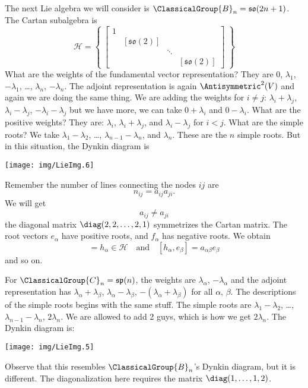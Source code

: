The next Lie algebra we will consider is
$\ClassicalGroup{B}_{n}=\mathfrak{so}(2n+1)$. The Cartan
subalgebra is
\begin{equation}
\mathscr{H}=\left\{\;\begin{bmatrix}
1 &                    &        &  \\
  & [\mathfrak{so}(2)] &        &  \\
  &                    & \ddots &  \\
  &                    &        & [\mathfrak{so}(2)]
\end{bmatrix}\;\right\}
\end{equation}
What are the weights of the fundamental vector representation?
They are $0$, $\lambda_{1}$, $-\lambda_{1}$, \dots,
$\lambda_{n}$, $-\lambda_{n}$. The adjoint representation is
again $\Antisymmetric^{2}(V)$ and again we are doing the same
thing. We are adding the weights for $i\not=j$:
$\lambda_{i}+\lambda_{j}$, $\lambda_{i}-\lambda_{j}$,
$-\lambda_{i}-\lambda_{j}$ but we have more, we can take
$0+\lambda_{i}$ and $0-\lambda_{i}$. What are the positive
weights? They are: $\lambda_{i}$, $\lambda_{i}+\lambda_{j}$, and
$\lambda_{i}-\lambda_{j}$ for $i<j$. What are the simple roots?
We take $\lambda_{1}-\lambda_{2}$, \dots,
$\lambda_{n-1}-\lambda_{n}$, and $\lambda_{n}$. These are the $n$
simple roots. But in this situation, the Dynkin diagram is
\begin{center}
  \texttt{[image: img/LieImg.6]}
\end{center}
Remember the number of lines connecting the nodes $ij$ are
\begin{equation}
n_{ij}=a_{ij}a_{ji}.
\end{equation}
We will get
\begin{equation}
a_{ij}\not=a_{ji}
\end{equation}
the diagonal matrix $\diag(2,2,\dots,2,1)$ symmetrizes the Cartan
matrix. The root vectors $e_{\alpha}$ have positive roots, and
$f_{\alpha}$ has negative roots. We obtain
\begin{equation}
[e_{\alpha},f_{\alpha}]=h_{\alpha}\in\mathscr{H}\quad\mbox{and}\quad [h_{\alpha},e_{\beta}]=a_{\alpha\beta}e_{\beta}
\end{equation}
and so on.

For $\ClassicalGroup{C}_{n}=\mathfrak{sp}(n)$, the weights are
$\lambda_{\alpha}$, $-\lambda_{\alpha}$ and the adjoint
representation has $\lambda_{\alpha}+\lambda_{\beta}$,
$\lambda_{\alpha}-\lambda_{\beta}$,
$-(\lambda_{\alpha}+\lambda_{\beta})$ for all $\alpha$,
$\beta$. The descriptions of the simple roots begins with the
same stuff. The simple roots are $\lambda_{1}-\lambda_{2}$,
\dots, $\lambda_{n-1}-\lambda_{n}$, $2\lambda_{n}$. We are
allowed to add 2 guys, which is how we get $2\lambda_{n}$. The
Dynkin diagram is:
\begin{center}
  \texttt{[image: img/LieImg.5]}
\end{center}
Observe that this resembles $\ClassicalGroup{B}_{n}$'s Dynkin
diagram, but it is different. The diagonalization here requires
the matrix $\diag(1,\dots,1,2)$.
